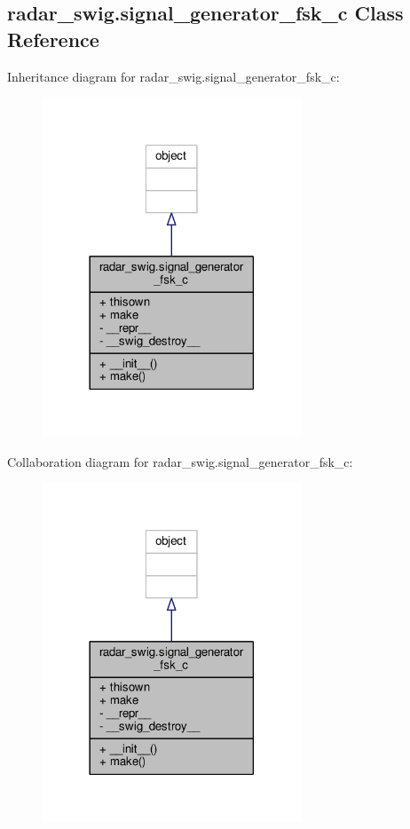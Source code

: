 \subsection{radar\+\_\+swig.\+signal\+\_\+generator\+\_\+fsk\+\_\+c Class Reference}
\label{classradar__swig_1_1signal__generator__fsk__c}


Inheritance diagram for radar\+\_\+swig.\+signal\+\_\+generator\+\_\+fsk\+\_\+c\+:
\nopagebreak
\begin{figure}[H]
\begin{center}
\leavevmode
\includegraphics[width=218pt]{d7/d08/classradar__swig_1_1signal__generator__fsk__c__inherit__graph}
\end{center}
\end{figure}


Collaboration diagram for radar\+\_\+swig.\+signal\+\_\+generator\+\_\+fsk\+\_\+c\+:
\nopagebreak
\begin{figure}[H]
\begin{center}
\leavevmode
\includegraphics[width=218pt]{d8/d62/classradar__swig_1_1signal__generator__fsk__c__coll__graph}
\end{center}
\end{figure}
